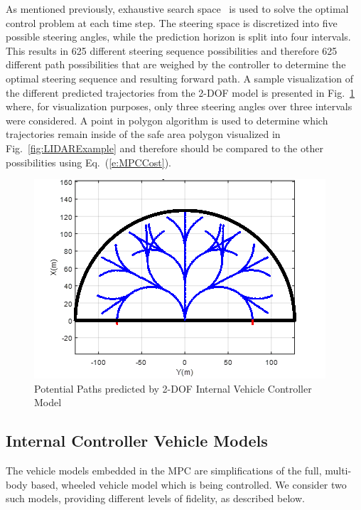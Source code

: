 \documentclass[12pt,twocolumn]{article}
\newcommand{\CHRONO}{{\sffamily{{Chrono}}}}
\begin{document}
As mentioned previously, exhaustive search space~\cite{ModelFidelity2016} is used to solve the optimal control problem at each time step. The steering space is discretized into five possible steering angles, while the prediction horizon is split into four intervals. This results in 625 different steering sequence possibilities and therefore 625 different path possibilities that are weighed by the controller to determine the optimal steering sequence and resulting forward path. A sample visualization of the different predicted trajectories from the 2-DOF model is presented in Fig.~\ref{fig:PossiblePaths} where, for visualization purposes, only three steering angles over three intervals were considered. A point in polygon algorithm is used to determine which trajectories remain inside of the safe area polygon visualized in Fig.~\ref{fig:LIDARExample} and therefore should be compared to the other possibilities using Eq.~(\ref{e:MPCCost}).

\begin{figure}
	\centering
	\includegraphics[width=\columnwidth]{Figs/PathPossibilities.png}
	\caption{\small Potential Paths predicted by 2-DOF Internal Vehicle Controller Model}  
	\label{fig:PossiblePaths}
\end{figure}


\subsection{Internal Controller Vehicle Models}\label{ss:IntModel}

The vehicle models embedded in the MPC are simplifications of the full, multi-body based, {\CHRONO} wheeled vehicle model which is being controlled.  We consider two such models, providing different levels of fidelity, as described below.
\end{document}
